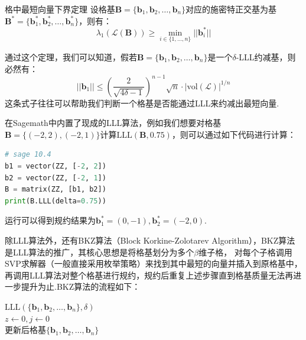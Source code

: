 \documentclass{book}
\numberwithin{equation}{subsubsection}
\begin{document}
\begin{concept}{格中最短向量下界定理}
    设格基$\pmb{B}=\{\pmb{b}_1,\pmb{b}_2,\ldots,\pmb{b}_n\}$对应的施密特正交基为基$\pmb{B}^*=\{\pmb{b}_1^*,\pmb{b}_2^*,\ldots,\pmb{b}_n^*\}$，则有：
    \begin{equation}
        \lambda_1(\mathcal{L}(\pmb{B}))\ge\min_{i\in\{1,\ldots,n\}}||\pmb{b}^{*}_{i}||
        \nonumber
    \end{equation}
\end{concept}

通过这个定理，我们可以知道，假若$\pmb{B}=\{\pmb{b}_1,\pmb{b}_2,\ldots,\pmb{b}_n\}$是一个$\delta$-LLL约减基，则必然有：
\begin{equation}
    ||\pmb{b}_1||\le\left(\frac{2}{\sqrt{4\delta-1}}\right)^{n-1}\sqrt{n}\cdot|\text{vol}(\mathcal{L})|^{1/n}
    \nonumber
\end{equation}
这条式子往往可以帮助我们判断一个格基是否能通过LLL来约减出最短向量.\par
在Sagemath中内置了现成的LLL算法，例如我们想要对格基$\pmb{B}=\{(-2,2), (-2, 1)\}$计算$\text{LLL}(\pmb{B},0.75)$，则可以通过如下代码进行计算：
\begin{lstlisting}[language=Python,basicstyle=\ttfamily,breaklines=true,keywordstyle=\bfseries\color{blue}]
# sage 10.4
b1 = vector(ZZ, [-2, 2])
b2 = vector(ZZ, [-2, 1])
B = matrix(ZZ, [b1, b2])
print(B.LLL(delta=0.75))
\end{lstlisting}
运行可以得到规约结果为$\pmb{b}_1^*=(0, -1),\pmb{b}_2^*=(-2, 0)$.\par
除LLL算法外，还有BKZ算法（Block Korkine-Zolotarev Algorithm）\cite{18}，BKZ算法是LLL算法的推广，其核心思想是将格基划分为多个$\beta$维子格，
对每个子格调用SVP求解器（一般直接采用枚举策略）来找到其中最短的向量并插入到原格基中，再调用LLL算法对整个格基进行规约，规约后重复上述步骤直到格基质量无法再进一步提升为止.BKZ算法的流程如下：
\begin{algorithm}[h!]
    \caption{$\text{BKZ}(\{\pmb{b}_1,\pmb{b}_2,\ldots,\pmb{b}_n\},\beta,\delta)$}
    $\text{LLL}(\{\pmb{b}_1,\pmb{b}_2,\ldots,\pmb{b}_n\},\delta)$\\
    $z\leftarrow 0,j\leftarrow 0$\\
    \Return 更新后格基$\{\pmb{b}_1,\pmb{b}_2,\ldots,\pmb{b}_n\}$\\
\end{algorithm}\\
\end{document}
